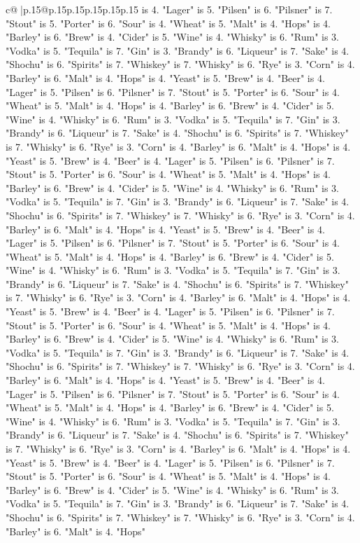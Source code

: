 \documentclass{article}
\begin{document}
{\begin{supertabular}{c@{$\;$}|p{.15\linewidth}@{}p{.15\linewidth}p{.15\linewidth}p{.15\linewidth}p{.15\linewidth}p{.15\linewidth}}
{{{is 4. "Lager" is 5. "Pilsen" is 6. "Pilsner" is 7. "Stout" is 5. "Porter" is 6. "Sour" is 4. "Wheat" is 5. "Malt" is 4. "Hops" is 4. "Barley" is 6. "Brew" is 4. "Cider" is 5. "Wine" is 4. "Whisky" is 6. "Rum" is 3. "Vodka" is 5. "Tequila" is 7. "Gin" is 3. "Brandy" is 6. "Liqueur" is 7. "Sake" is 4. "Shochu" is 6. "Spirits" is 7. "Whiskey" is 7. "Whisky" is 6. "Rye" is 3. "Corn" is 4. "Barley" is 6. "Malt" is 4. "Hops" is 4. "Yeast" is 5. "Brew" is 4. "Beer" is 4. "Lager" is 5. "Pilsen" is 6. "Pilsner" is 7. "Stout" is 5. "Porter" is 6. "Sour" is 4. "Wheat" is 5. "Malt" is 4. "Hops" is 4. "Barley" is 6. "Brew" is 4. "Cider" is 5. "Wine" is 4. "Whisky" is 6. "Rum" is 3. "Vodka" is 5. "Tequila" is 7. "Gin" is 3. "Brandy" is 6. "Liqueur" is 7. "Sake" is 4. "Shochu" is 6. "Spirits" is 7. "Whiskey" is 7. "Whisky" is 6. "Rye" is 3. "Corn" is 4. "Barley" is 6. "Malt" is 4. "Hops" is 4. "Yeast" is 5. "Brew" is 4. "Beer" is 4. "Lager" is 5. "Pilsen" is 6. "Pilsner" is 7. "Stout" is 5. "Porter" is 6. "Sour" is 4. "Wheat" is 5. "Malt" is 4. "Hops" is 4. "Barley" is 6. "Brew" is 4. "Cider" is 5. "Wine" is 4. "Whisky" is 6. "Rum" is 3. "Vodka" is 5. "Tequila" is 7. "Gin" is 3. "Brandy" is 6. "Liqueur" is 7. "Sake" is 4. "Shochu" is 6. "Spirits" is 7. "Whiskey" is 7. "Whisky" is 6. "Rye" is 3. "Corn" is 4. "Barley" is 6. "Malt" is 4. "Hops" is 4. "Yeast" is 5. "Brew" is 4. "Beer" is 4. "Lager" is 5. "Pilsen" is 6. "Pilsner" is 7. "Stout" is 5. "Porter" is 6. "Sour" is 4. "Wheat" is 5. "Malt" is 4. "Hops" is 4. "Barley" is 6. "Brew" is 4. "Cider" is 5. "Wine" is 4. "Whisky" is 6. "Rum" is 3. "Vodka" is 5. "Tequila" is 7. "Gin" is 3. "Brandy" is 6. "Liqueur" is 7. "Sake" is 4. "Shochu" is 6. "Spirits" is 7. "Whiskey" is 7. "Whisky" is 6. "Rye" is 3. "Corn" is 4. "Barley" is 6. "Malt" is 4. "Hops" is 4. "Yeast" is 5. "Brew" is 4. "Beer" is 4. "Lager" is 5. "Pilsen" is 6. "Pilsner" is 7. "Stout" is 5. "Porter" is 6. "Sour" is 4. "Wheat" is 5. "Malt" is 4. "Hops" is 4. "Barley" is 6. "Brew" is 4. "Cider" is 5. "Wine" is 4. "Whisky" is 6. "Rum" is 3. "Vodka" is 5. "Tequila" is 7. "Gin" is 3. "Brandy" is 6. "Liqueur" is 7. "Sake" is 4. "Shochu" is 6. "Spirits" is 7. "Whiskey" is 7. "Whisky" is 6. "Rye" is 3. "Corn" is 4. "Barley" is 6. "Malt" is 4. "Hops" is 4. "Yeast" is 5. "Brew" is 4. "Beer" is 4. "Lager" is 5. "Pilsen" is 6. "Pilsner" is 7. "Stout" is 5. "Porter" is 6. "Sour" is 4. "Wheat" is 5. "Malt" is 4. "Hops" is 4. "Barley" is 6. "Brew" is 4. "Cider" is 5. "Wine" is 4. "Whisky" is 6. "Rum" is 3. "Vodka" is 5. "Tequila" is 7. "Gin" is 3. "Brandy" is 6. "Liqueur" is 7. "Sake" is 4. "Shochu" is 6. "Spirits" is 7. "Whiskey" is 7. "Whisky" is 6. "Rye" is 3. "Corn" is 4. "Barley" is 6. "Malt" is 4. "Hops" is 4. "Yeast" is 5. "Brew" is 4. "Beer" is 4. "Lager" is 5. "Pilsen" is 6. "Pilsner" is 7. "Stout" is 5. "Porter" is 6. "Sour" is 4. "Wheat" is 5. "Malt" is 4. "Hops" is 4. "Barley" is 6. "Brew" is 4. "Cider" is 5. "Wine" is 4. "Whisky" is 6. "Rum" is 3. "Vodka" is 5. "Tequila" is 7. "Gin" is 3. "Brandy" is 6. "Liqueur" is 7. "Sake" is 4. "Shochu" is 6. "Spirits" is 7. "Whiskey" is 7. "Whisky" is 6. "Rye" is 3. "Corn" is 4. "Barley" is 6. "Malt" is 4. "Hops" }}}
\end{supertabular}}
\end{document}
